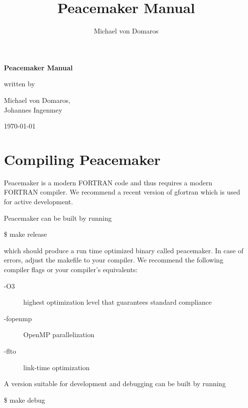 \documentclass{scrartcl}
\begin{document}


\title{Peacemaker Manual}
\author{Michael von Domaros}
\begin{titlepage}
    \centering
    \Large

    \vspace*{5ex}
    \textbf{\Huge Peacemaker Manual}

    \vspace{\fill}
    written by
    
    \vspace{1ex}
    Michael von Domaros,\\
    Johannes Ingenmey
    
    \vspace{2ex}
    \today
    \vspace{\fill}
\end{titlepage}

\tableofcontents
\pagebreak


\section{Compiling Peacemaker}

Peacemaker is a modern FORTRAN code and thus requires a modern FORTRAN compiler.
We recommend a recent version of gfortran which is used for active development.

Peacemaker can be built by running
\begin{addmargin}[1cm]{0cm}
    \ttfamily
    \$ make release
\end{addmargin}
which should produce a run time optimized binary called peacemaker.
In case of errors, adjust the makefile to your compiler.
We recommend the following compiler flags or your compiler's equivalents:
\begin{addmargin}[1cm]{0cm}
    \begin{description}
        \item[-O3] highest optimization level that guarantees standard compliance
        \item[-fopenmp] OpenMP parallelization
        \item[-flto] link-time optimization
    \end{description}
\end{addmargin}

A version suitable for development and debugging can be built by running
\begin{addmargin}[1cm]{0cm}
    \ttfamily
    \$ make debug
\end{addmargin}
\end{document}
